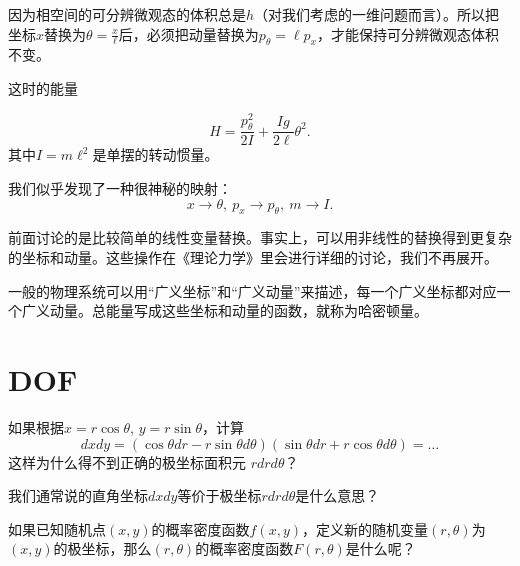 \documentclass[CJK]{beamer}
\begin{document}
\begin{frame}
\bch
{\large
因为相空间的可分辨微观态的体积总是$h$（对我们考虑的一维问题而言）。所以把坐标$x$替换为$\theta = \frac{x}{\ell}$后，必须把动量替换为$p_\theta = \ell p_x$，才能保持可分辨微观态体积不变。

这时的能量

$$H = \frac{p_\theta^2}{2I}+\frac{Ig}{2\ell}  \theta^2. $$
其中$I=m\ell^2$是单摆的转动惯量。

\skipline
我们似乎发现了一种很神秘的映射：
$$ x \rightarrow \theta,\ p_x\rightarrow p_\theta,\ m\rightarrow I.$$}
\ech
\end{frame}

\begin{frame}
\bch
{\large
  前面讨论的是比较简单的线性变量替换。事实上，可以用非线性的替换得到更复杂的坐标和动量。这些操作在《理论力学》里会进行详细的讨论，我们不再展开。

  
  {\blue 一般的物理系统可以用``广义坐标''和``广义动量''来描述，每一个广义坐标都对应一个广义动量。总能量写成这些坐标和动量的函数，就称为哈密顿量。}
}
\ech
\end{frame}




\section{DOF}


\begin{frame}
\bch
    {\large
      }

\ech
\end{frame}

\begin{frame}
\bch
{}
{\large
如果根据$x=r\cos\theta$, $y=r\sin\theta$，计算
$$dx dy = (\cos\theta dr - r\sin\theta d\theta)(\sin\theta dr + r\cos\theta d\theta) = \ldots $$
这样为什么得不到正确的极坐标面积元 $rdrd\theta$？

\skipline

我们通常说的直角坐标$dxdy$等价于极坐标$r dr d\theta$是什么意思？}
\ech
\end{frame}


\begin{frame}
\bch
{}

{\Large
如果已知随机点$(x,y)$的概率密度函数$f(x,y)$，定义新的随机变量$(r,\theta)$为$(x,y)$的极坐标，那么$(r,\theta)$的概率密度函数$F(r,\theta)$是什么呢？}

\ech
\end{frame}
\end{document}
